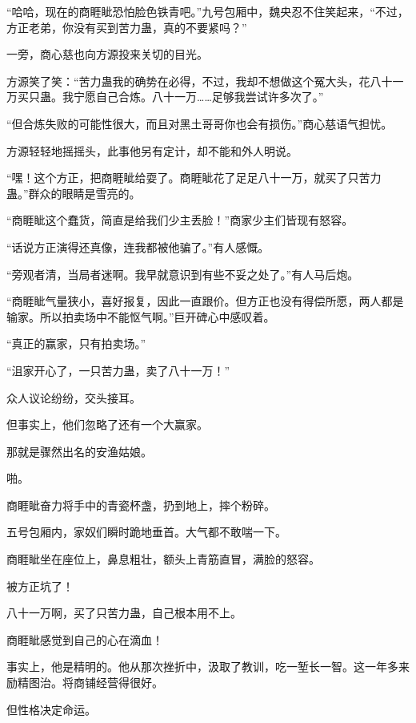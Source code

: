 
\begin{this_body}



“哈哈，现在的商睚眦恐怕脸色铁青吧。”九号包厢中，魏央忍不住笑起来，“不过，方正老弟，你没有买到苦力蛊，真的不要紧吗？”

一旁，商心慈也向方源投来关切的目光。

方源笑了笑：“苦力蛊我的确势在必得，不过，我却不想做这个冤大头，花八十一万买只蛊。我宁愿自己合炼。八十一万……足够我尝试许多次了。”

“但合炼失败的可能性很大，而且对黑土哥哥你也会有损伤。”商心慈语气担忧。

方源轻轻地摇摇头，此事他另有定计，却不能和外人明说。

“嘿！这个方正，把商睚眦给耍了。商睚眦花了足足八十一万，就买了只苦力蛊。”群众的眼睛是雪亮的。

“商睚眦这个蠢货，简直是给我们少主丢脸！”商家少主们皆现有怒容。

“话说方正演得还真像，连我都被他骗了。”有人感慨。

“旁观者清，当局者迷啊。我早就意识到有些不妥之处了。”有人马后炮。

“商睚眦气量狭小，喜好报复，因此一直跟价。但方正也没有得偿所愿，两人都是输家。所以拍卖场中不能怄气啊。”巨开碑心中感叹着。

“真正的赢家，只有拍卖场。”

“沮家开心了，一只苦力蛊，卖了八十一万！”

众人议论纷纷，交头接耳。

但事实上，他们忽略了还有一个大赢家。

那就是骤然出名的安渔姑娘。

啪。

商睚眦奋力将手中的青瓷杯盏，扔到地上，摔个粉碎。

五号包厢内，家奴们瞬时跪地垂首。大气都不敢喘一下。

商睚眦坐在座位上，鼻息粗壮，额头上青筋直冒，满脸的怒容。

被方正坑了！

八十一万啊，买了只苦力蛊，自己根本用不上。

商睚眦感觉到自己的心在滴血！

事实上，他是精明的。他从那次挫折中，汲取了教训，吃一堑长一智。这一年多来励精图治。将商铺经营得很好。

但性格决定命运。


\end{this_body}

